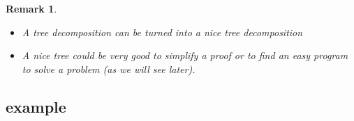 \documentclass[8pt]{beamer}
\newtheorem*{remark}{Remark}
\begin{document}
\begin{frame}
\begin{definition}
\begin{tabular}{c|c|c|c}
    \end{tabular}
  \end{definition}

  \begin{remark}
    \begin{itemize}
    \item A tree decomposition can be turned into a nice tree decomposition
    \item A nice tree could be very good to simplify a proof or to find an easy program to solve a problem (as we will see later).
    \end{itemize}
  \end{remark}
  

\end{frame}


\subsection{example}
\end{document}
